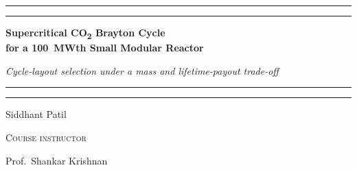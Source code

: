 \documentclass[11pt,a4paper]{article}
\newcommand{\cotwo}{CO\textsubscript{2}}
\begin{document}
\begin{titlepage}
\thispagestyle{empty}
\centering
{\color{black!70}\rule{\textwidth}{0.4pt}}\par\vspace{-0.25cm}
\rule{\textwidth}{1.6pt}\par\vspace{0.6cm}
{\fontsize{22}{27}\selectfont\bfseries Supercritical \cotwo{} Brayton Cycle\\[4pt] for a \SI{100}{MWth} Small Modular Reactor\par}
\vspace{0.45cm}
{\large\itshape Cycle-layout selection under a mass and lifetime-payout trade-off\par}
\vspace{0.55cm}
\rule{\textwidth}{1.6pt}\par\vspace{-0.25cm}
{\color{black!70}\rule{\textwidth}{0.4pt}}\par
\vspace{1.3cm}

{\Large Siddhant Patil\par}
\vspace{0.5cm}
{\small\scshape Course instructor\par}\vspace{0.1cm}
{\large Prof.\ Shankar Krishnan\par}


\end{titlepage}
\end{document}
